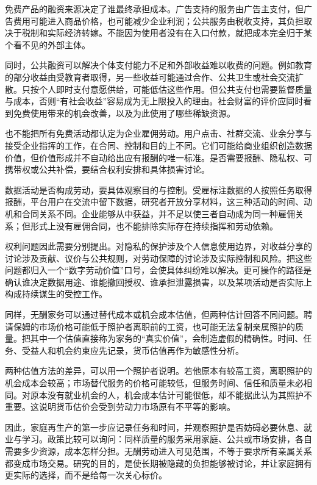 \documentclass[UTF8,fontset=fandol,zihao=-4,oneside,openany]{ctexbook}
\begin{document}
\label{arg:P050}
免费产品的融资来源决定了谁最终承担成本。广告支持的服务由广告主支付，但广告费用可能进入商品价格，也可能减少企业利润；公共服务由税收支持，其负担取决于税制和实际经济转嫁。不能因为使用者没有在入口付款，就把成本完全归于某个看不见的外部主体。

同时，公共融资可以解决个体支付能力不足和外部收益难以收费的问题。例如教育的部分收益由受教育者取得，另一些收益可能通过合作、公共卫生或社会交流扩散。只按个人即时支付意愿供给，可能低估这些作用。但公共支付也需要监督质量与成本，否则“有社会收益”容易成为无上限投入的理由。社会财富的评价应同时看到免费使用带来的机会改善，以及为此使用了哪些稀缺资源。

也不能把所有免费活动都认定为企业雇佣劳动。用户点击、社群交流、业余分享与接受企业指挥的工作，在合同、控制和目的上不同。它们可能给商业组织创造数据价值，但价值形成并不自动给出应有报酬的唯一标准。是否需要报酬、隐私权、可携带权或公共补偿，要结合权利安排和具体损害讨论。

\label{arg:P051}
数据活动是否构成劳动，要具体观察目的与控制。受雇标注数据的人按照任务取得报酬，平台用户在交流中留下数据，研究者开放分享材料，这三种活动的时间、动机和合同关系不同。企业能够从中获益，并不足以使三者自动成为同一种雇佣关系；但形式上没有雇佣合同，也不能排除实际存在持续指挥和劳动依赖。

权利问题因此需要分别提出。对隐私的保护涉及个人信息使用边界，对收益分享的讨论涉及贡献、议价与公共规则，对劳动保障的讨论涉及实际控制和风险。把这些问题都归入一个“数字劳动价值”口号，会使具体纠纷难以解决。更可操作的路径是确认谁决定数据用途、谁能撤回授权、谁承担泄露损害，以及某项活动是否实际上构成持续谋生的受控工作。

同样，无酬家务可以通过替代成本或机会成本估值，但两种估计回答不同问题。聘请保姆的市场价格可能低于照护者离职前的工资，也可能无法复制亲属照护的质量。把其中一个估值直接称为家务的“真实价值”，会制造虚假的精确性。时间、任务、受益人和机会约束应先记录，货币估值再作为敏感性分析。

\label{arg:P052}
两种估值方法的差异，可以用一个照护者说明。若他原本有较高工资，离职照护的机会成本会较高；市场替代服务的价格可能较低，但服务时间、信任和质量未必相同。对原本没有就业机会的人，机会成本估计可能很低，却不能据此认为其照护不重要。这说明货币估价会受到劳动力市场原有不平等的影响。

因此，家庭再生产的第一步应记录任务和时间，并观察照护是否妨碍必要休息、就业与学习。政策比较可以询问：同样质量的服务采用家庭、公共或市场安排，各自需要多少资源，成本怎样分担。无酬劳动进入可见范围，不等于要求所有亲属关系都变成市场交易。研究的目的，是使长期被隐藏的负担能够被讨论，并让家庭拥有更实际的选择，而不是给每一次关心标价。
\end{document}
